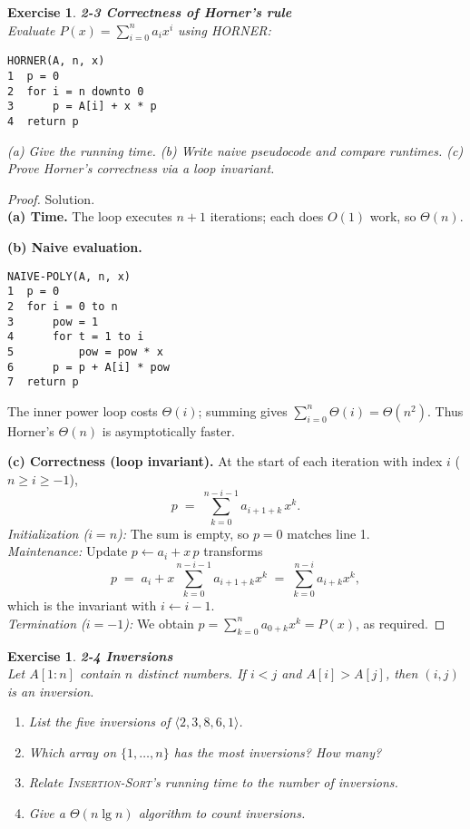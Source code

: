 \documentclass[12pt]{article}
\newtheorem{exercise}[theorem]{Exercise}
\theoremstyle{definition}
\begin{document}
\newpage

\begin{exercise}
\noindent
\textbf{2-3 Correctness of Horner’s rule}\\
\noindent
Evaluate $P(x)=\sum_{i=0}^{n} a_i x^{i}$ using \textsc{HORNER}:
\begin{verbatim}
HORNER(A, n, x)
1  p = 0
2  for i = n downto 0
3      p = A[i] + x * p
4  return p
\end{verbatim}
(a) Give the running time. (b) Write naive pseudocode and compare runtimes.
(c) Prove Horner’s correctness via a loop invariant.
\end{exercise}

\vspace{1pt}

\begin{proof}
Solution.\\

\noindent
\textbf{(a) Time.} The loop executes $n+1$ iterations; each does $O(1)$ work, so $\Theta(n)$.

\smallskip
\noindent
\textbf{(b) Naive evaluation.}
\begin{verbatim}
NAIVE-POLY(A, n, x)
1  p = 0
2  for i = 0 to n
3      pow = 1
4      for t = 1 to i
5          pow = pow * x
6      p = p + A[i] * pow
7  return p
\end{verbatim}
The inner power loop costs $\Theta(i)$; summing gives $\sum_{i=0}^{n}\Theta(i)=\Theta(n^2)$.
Thus Horner’s $\Theta(n)$ is asymptotically faster.

\smallskip
\noindent
\textbf{(c) Correctness (loop invariant).}
At the start of each iteration with index $i$ ($n\ge i\ge -1$),
\[
p \;=\; \sum_{k=0}^{n-i-1} a_{i+1+k}\,x^{k}.
\]
\emph{Initialization ($i=n$):} The sum is empty, so $p=0$ matches line 1.\\
\emph{Maintenance:} Update $p\gets a_i+x\,p$ transforms
\[
p \;=\; a_i + x\sum_{k=0}^{n-i-1} a_{i+1+k}x^{k}
      \;=\; \sum_{k=0}^{n-i} a_{i+k}x^{k},
\]
which is the invariant with $i\gets i-1$.\\
\emph{Termination ($i=-1$):} We obtain $p=\sum_{k=0}^{n} a_{0+k}x^{k}=P(x)$, as required.
\end{proof}

\newpage

\begin{exercise}
\noindent
\textbf{2-4 Inversions}\\
\noindent
Let $A[1:n]$ contain $n$ distinct numbers. If $i<j$ and $A[i]>A[j]$, then $(i,j)$ is an inversion.
\begin{enumerate}\itemsep0.25em
\item[(a)] List the five inversions of $\langle 2,3,8,6,1\rangle$.
\item[(b)] Which array on $\{1,\dots,n\}$ has the most inversions? How many?
\item[(c)] Relate \textsc{Insertion-Sort}’s running time to the number of inversions.
\item[(d)] Give a $\Theta(n\lg n)$ algorithm to count inversions.
\end{enumerate}
\end{exercise}
\end{document}
